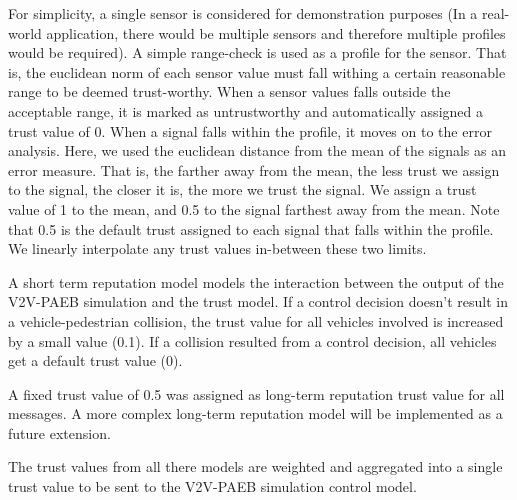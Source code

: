 \documentclass[conference]{IEEEtran}
\begin{document}


For simplicity, a single sensor is considered for demonstration purposes (In a real-world application, there would be multiple sensors and therefore multiple profiles would be required). A simple range-check is used as a profile for the sensor. That is, the euclidean norm of each sensor value must fall withing a certain reasonable range to be deemed trust-worthy. When a sensor values falls outside the acceptable range, it is marked as untrustworthy and automatically assigned a trust value of 0. When a signal falls within the profile, it moves on to the error analysis. Here, we used the euclidean distance from the mean of the signals as an error measure. That is, the farther away from the mean, the less trust we assign to the signal, the closer it is, the more we trust the signal. We assign a trust value of 1 to the mean, and 0.5 to the signal farthest away from the mean. Note that 0.5 is the default trust assigned to each signal that falls within the profile. We linearly interpolate any trust values in-between these two limits.

A short term reputation model models the interaction between the output of the V2V-PAEB simulation and the trust model. If a control decision doesn't result in a vehicle-pedestrian collision, the trust value for all vehicles involved is increased by a small value (0.1). If a collision resulted from a control decision, all vehicles get a default trust value (0).

A fixed trust value of 0.5 was assigned as long-term reputation trust value for all messages. A more complex long-term reputation model will be implemented as a future extension.

The trust values from all there models are weighted and aggregated into a single trust value to be sent to the V2V-PAEB simulation control model.
\end{document}

